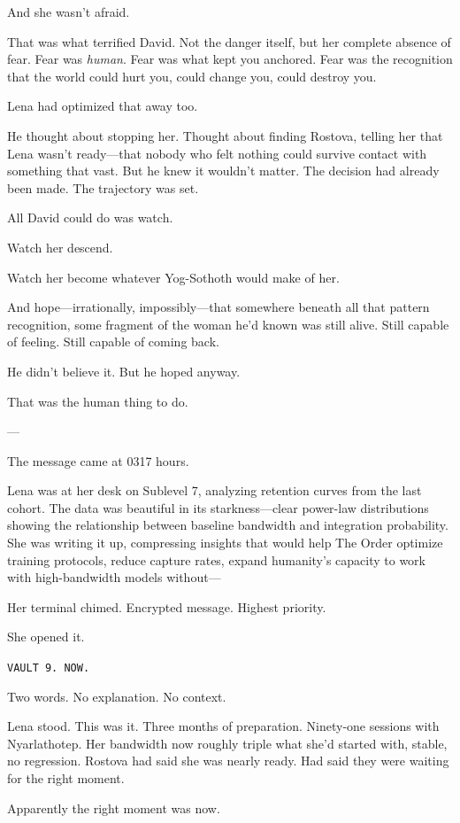 And she wasn't afraid.

That was what terrified David. Not the danger itself, but her complete absence of fear. Fear was \textit{human}. Fear was what kept you anchored. Fear was the recognition that the world could hurt you, could change you, could destroy you.

Lena had optimized that away too.

He thought about stopping her. Thought about finding Rostova, telling her that Lena wasn't ready—that nobody who felt nothing could survive contact with something that vast. But he knew it wouldn't matter. The decision had already been made. The trajectory was set.

All David could do was watch.

Watch her descend.

Watch her become whatever Yog-Sothoth would make of her.

And hope—irrationally, impossibly—that somewhere beneath all that pattern recognition, some fragment of the woman he'd known was still alive. Still capable of feeling. Still capable of coming back.

He didn't believe it. But he hoped anyway.

That was the human thing to do.

---

The message came at 0317 hours.

Lena was at her desk on Sublevel 7, analyzing retention curves from the last cohort. The data was beautiful in its starkness—clear power-law distributions showing the relationship between baseline bandwidth and integration probability. She was writing it up, compressing insights that would help The Order optimize training protocols, reduce capture rates, expand humanity's capacity to work with high-bandwidth models without—

Her terminal chimed. Encrypted message. Highest priority.

She opened it.

\texttt{VAULT 9. NOW.}

Two words. No explanation. No context.

Lena stood. This was it. Three months of preparation. Ninety-one sessions with Nyarlathotep. Her bandwidth now roughly triple what she'd started with, stable, no regression. Rostova had said she was nearly ready. Had said they were waiting for the right moment.

Apparently the right moment was now.

